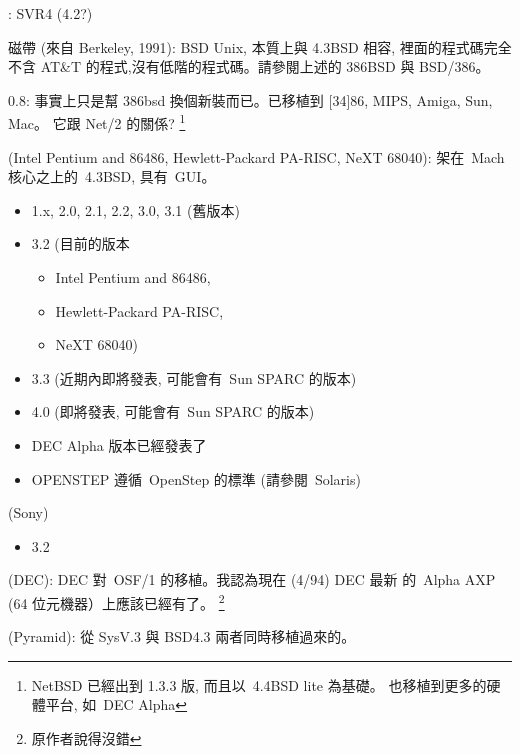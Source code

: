\documentclass{article}
\begin{document}
\begin{CJK*}{Bg5}{ming}
      \item [NCR UNIX]: SVR4 (4.2?)

      \item [Net/2] 磁帶 (來自 Berkeley, 1991): BSD Unix, 本質上與 4.3BSD 相容,
         裡面的程式碼完全不含 AT\&T 的程式,沒有低階的程式碼。請參閱上述的
         386BSD 與 BSD/386。

      \item [NetBSD] 0.8: 事實上只是幫 386bsd 換個新裝而已。已移植到 [34]86, MIPS,
         Amiga, Sun, Mac。 它跟 Net/2 的關係?
        \footnote{NetBSD 已經出到 1.3.3 版, 而且以~4.4BSD lite 為基礎。
                 也移植到更多的硬體平台, 如~DEC Alpha}

      \item [NEXTSTEP] (Intel Pentium and 86486, Hewlett-Packard PA-RISC, NeXT 68040):
         架在~Mach 核心之上的~4.3BSD, 具有~GUI。
	\begin{itemize}
         \item 1.x, 2.0, 2.1, 2.2, 3.0, 3.1 (舊版本)
         \item 3.2 (目前的版本
	 \begin{itemize}
            \item  Intel Pentium and 86486,
            \item  Hewlett-Packard PA-RISC,
            \item  NeXT 68040)
	 \end{itemize}
         \item 3.3 (近期內即將發表, 可能會有~Sun SPARC 的版本)
         \item 4.0 (即將發表, 可能會有~Sun SPARC 的版本)
         \item DEC Alpha 版本已經發表了
         \item OPENSTEP 遵循~OpenStep 的標準 (請參閱~Solaris)
	\end{itemize}

      \item [NEWS-OS] (Sony)
	\begin{itemize}
         \item 3.2
	\end{itemize}

     \item [OSF/1] (DEC): DEC 對~OSF/1 的移植。我認為現在 (4/94) DEC 最新
        的~Alpha AXP (64 位元機器）上應該已經有了。
        \footnote{原作者說得沒錯}

     \item [OSx] (Pyramid): 從 SysV.3 與 BSD4.3 兩者同時移植過來的。


\end{CJK*}
\end{document}
